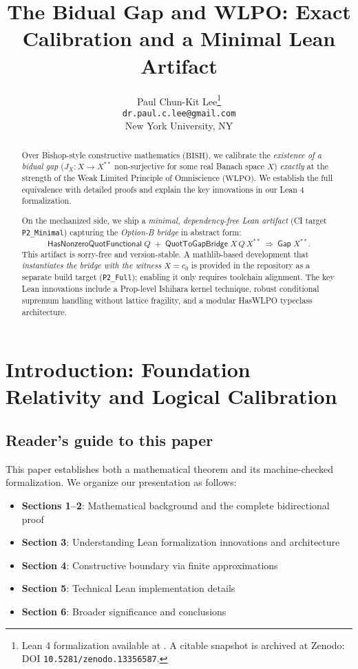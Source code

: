 \documentclass[11pt]{article}  %
\title{The Bidual Gap and WLPO: Exact Calibration and a Minimal Lean Artifact}
\author{Paul Chun-Kit Lee\thanks{Lean 4 formalization available at \leanRepo. A citable snapshot is archived at Zenodo: DOI \texttt{10.5281/zenodo.13356587}.} \\ 
\texttt{dr.paul.c.lee@gmail.com} \\
New York University, NY}
\date{}
\newcommand{\WLPO}{\mathrm{WLPO}}
\newcommand{\BISH}{\mathrm{BISH}}
\begin{document}
\begin{abstract}
Over Bishop-style constructive mathematics ($\BISH$), we calibrate the \emph{existence of a bidual gap}
($J_X:X\to X^{**}$ non-surjective for some real Banach space $X$) \emph{exactly} at the strength of
the Weak Limited Principle of Omniscience ($\WLPO$). We establish the full equivalence with detailed proofs 
and explain the key innovations in our Lean 4 formalization.

On the mechanized side, we ship a \emph{minimal, dependency-free Lean artifact} (CI target \texttt{P2\_Minimal})
capturing the \emph{Option-B bridge} in abstract form:
\[
\textsf{HasNonzeroQuotFunctional}\;Q \;+\; \textsf{QuotToGapBridge}\;X\,Q\,X^{**}\ \Longrightarrow\ \textsf{Gap}\;X^{**}.
\]
This artifact is sorry-free and version-stable. A mathlib-based development that \emph{instantiates the bridge with the witness $X=c_0$} is provided in the repository as a separate build target (\texttt{P2\_Full}); enabling it only requires toolchain alignment. The key Lean innovations include a Prop-level Ishihara kernel technique, robust conditional supremum handling without lattice fragility, and a modular HasWLPO typeclass architecture.
\end{abstract}

\maketitle

\tableofcontents

\section{Introduction: Foundation Relativity and Logical Calibration}

\subsection{Reader's guide to this paper}

This paper establishes both a mathematical theorem and its machine-checked formalization. We organize our presentation as follows:

\begin{itemize}
\item \textbf{Sections 1--2}: Mathematical background and the complete bidirectional proof
\item \textbf{Section 3}: Understanding Lean formalization innovations and architecture  
\item \textbf{Section 4}: Constructive boundary via finite approximations
\item \textbf{Section 5}: Technical Lean implementation details
\item \textbf{Section 6}: Broader significance and conclusions
\end{itemize}
\end{document}

